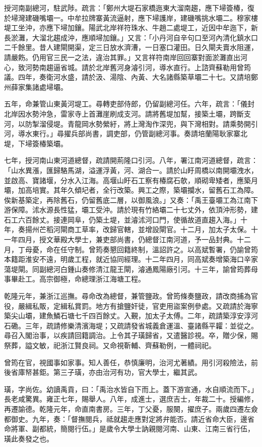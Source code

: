 \begin{pinyinscope}
授河南副總河，駐武陟。疏言：「鄭州大堤石家橋迤東大溜南趨，應下埽簽椿，復於埽灣建磯嘴壩一。中牟拉牌寨黃流逼射，應下埽護岸，建磯嘴挑水壩二。穆家樓堤工坐沖，亦應下埽加鑲。陽武北岸祥符珠水、牛趙二處堤工，近因中牟迤下，新長淤灘，大溜北趨成沖，應順埽加鑲。」又言：「小丹河自辛句口至河內清化鎮水口二千餘里。昔人建閘開渠，定三日放水濟漕，一日塞口灌田。日久閘夫賣水阻運，請嚴飭。仍用官三民一之法，違治其罪。」又言祥符南岸回回寨對面淤灘直出河心，致河勢南趨逼省城。請於北岸舊河身濬引河，導水直行。上諮齊蘇勒用曾筠議。四年，奏衛河水盛，請於汲、湯陰、內黃、大名諸縣築草壩二十七。又請培鄭州薛家集諸處埽壩。

五年，命兼管山東黃河堤工。尋轉吏部侍郎，仍留副總河任。六年，疏言：「儀封北岸因水勢沖急，雷家寺上首灘崖刷成支河。請將舊堤加幫，接築土壩，跨斷支河，以防掣溜侵堤。青龍岡水勢縈紆，將上灣淘作深兜，與下灣相對。請乘勢開引河，導水東行。」尋擢兵部尚書，調吏部，仍管副總河事。奏請培蘭陽耿家寨北堤，下埽簽椿築壩。

七年，授河南山東河道總督，疏請開荊隆口引河。八年，署江南河道總督，疏言：「山水異漲，匯歸駱馬湖，溢運浮黃，河、湖合一。請於山盱周橋以南開壩洩水，並啟高、寶諸堰，分水入江海。高堰山盱石工察有椿腐石欹，順砌卑矮者，應築月壩，加高培實。其年久傾圮者，全行改築。興工之際，築壩攔水，留舊石工為障。俟新基築定，再除舊石，仍留舊底二層，以御風浪。」又奏：「禹王臺壩工為江南下游保障。沭水源長性猛，壩工受沖。請於現有竹絡壩二十七丈外，依頂沖形勢，建石工六百餘丈。接連岡阜，仍築土堤，並濬沭河口門，使循故道直趨入海。」十年，奏揚州芒稻河閘商工草率，改歸官轄，並增設閘官。十二月，加太子太保。十一年四月，授文華殿大學士，兼吏部尚書，仍總督江南河道，予一品封典。十二月，丁母憂，命在任守制。曾筠奏懇回籍終制，溫詔許之。以高斌暫署，仍諭曾筠本籍距淮安不遠，明歲工程，就近協同經理。十二年四月，同高斌奏增築海口辛家蕩堤閘。同副總河白鍾山奏修清江龍王閘，濬通鳳陽廠引河。十三年，諭曾筠葬母事畢赴工。高宗御極，命總理浙江海塘工程。

乾隆元年，兼浙江巡撫。尋命改為總督，兼管鹽政。曾筠條奏鹽政，請改商捕為官役，嚴緝私販，定緝私賞罰。地方有搶鹽奸徒，官吏用盜案例參處。又疏請於海寧築尖山壩，建魚鱗石塘七千四百餘丈。入覲，加太子太傅。二年，疏請築淳安淳河石磡。三年，疏請修樂清濱海堤；又疏請發省城義倉運溫、臺諸縣平糶：並從之。尋召入閣治事，以疾請回籍調治。上令其子璜歸省，又遣醫診視。卒，贈少保，賜祭葬，謚文敏，祀浙江賢良祠。又命視靳輔、齊蘇勒例，一體祠祀。

曾筠在官，視國事如家事。知人善任，恭慎廉明，治河尤著績。用引河殺險法，前後省庫帑甚鉅。第三子璜，亦由治河有功，官大學士，繼其武。

璜，字尚佐。幼讀禹貢，曰：「禹治水皆自下而上。蓋下游宣通，水自順流而下。」長老咸驚異。雍正七年，賜舉人。八年，成進士，選庶吉士，年裁二十。授編修，再遷諭德。乾隆元年，命直南書房。三年，丁父憂，服闋，擢庶子。兩歲四遷左僉都御史。九年，奏：「督撫閱兵，祗就趨走應對定將弁能否。請近省命大臣，邊省命將軍、副都統，簡閱行伍。」是歲令大學士訥親閱河南、山東、江南三省行伍，璜此奏發之也。


\end{pinyinscope}
